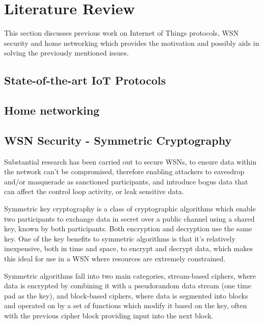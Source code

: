 \documentclass{mprop}
\begin{document}

\section{Literature Review}
This section discusses previous work on Internet of Things protocols, WSN security and home networking which provides the motivation and possibly aids in solving the previously mentioned issues.

\subsection{State-of-the-art IoT Protocols} %
\label{sub:state_of_the_art_iot_protocols}


\subsection{Home networking} %
\label{sub:homework_smart_home_router}


\subsection{WSN Security - Symmetric Cryptography} %
\label{sub:tinysec_minisec_contikisec}
Substantial research has been carried out to secure WSNs, to ensure data within the network can't be compromised, therefore enabling attackers to eavesdrop and/or masquerade as sanctioned participants, and introduce bogus data that can affect the control loop activity, or leak sensitive data.

Symmetric key cryptography is a class of cryptographic algorithms which enable two participants to exchange data in secret over a public channel using a shared key, known by both participants. Both encryption and decryption use the same key. One of the key benefits to symmetric algorithms is that it's relatively inexpensive, both in time and space, to encrypt and decrypt data, which makes this ideal for use in a WSN where resources are extremely constrained.

Symmetric algorithms fall into two main categories, stream-based ciphers, where data is encrypted by combining it with a pseudorandom data stream (one time pad as the key), and block-based ciphers, where data is segmented into blocks and operated on by a set of functions which modify it based on the key, often with the previous cipher block providing input into the next block. 
\end{document}
